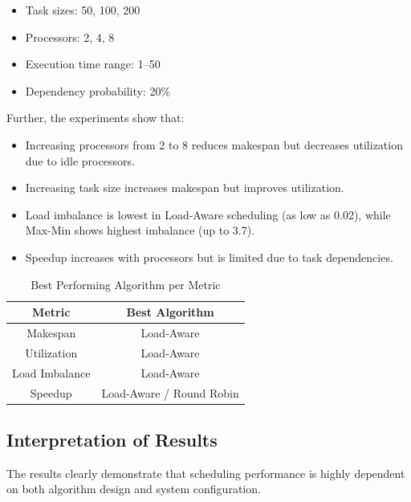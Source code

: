 \documentclass[12pt,a4paper]{article}
\begin{document}
\begin{itemize}
\item Task sizes: 50, 100, 200
\item Processors: 2, 4, 8
\item Execution time range: 1--50
\item Dependency probability: 20\%
\end{itemize}
Further, the experiments show that:
\begin{itemize}

\item Increasing processors from 2 to 8 reduces makespan but decreases utilization due to idle processors.

\item Increasing task size increases makespan but improves utilization.

\item Load imbalance is lowest in Load-Aware scheduling (as low as 0.02), while Max-Min shows highest imbalance (up to 3.7).

\item Speedup increases with processors but is limited due to task dependencies.

\end{itemize}




\begin{table}[h]
\centering
\caption{Best Performing Algorithm per Metric}
\begin{tabular}{|c|c|}
\hline
Metric & Best Algorithm \\
\hline
Makespan & Load-Aware \\
Utilization & Load-Aware \\
Load Imbalance & Load-Aware \\
Speedup & Load-Aware / Round Robin \\
\hline
\end{tabular}
\end{table}

\subsection*{Interpretation of Results}

The results clearly demonstrate that scheduling performance is highly dependent on both algorithm design and system configuration.
\end{document}
